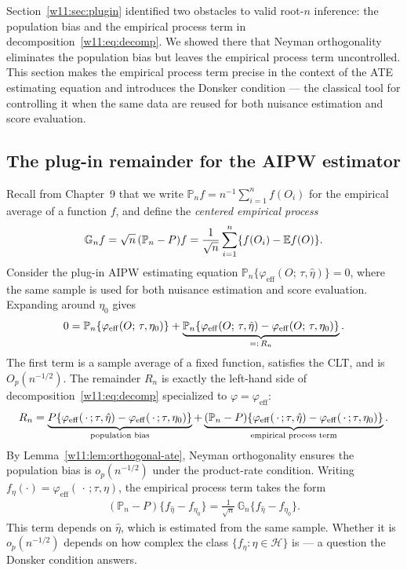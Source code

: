 \documentclass[master.tex]{subfiles}
\begin{document}
Section~\ref{w11:sec:plugin} identified two obstacles to valid
root-$n$ inference: the population bias and the empirical process
term in decomposition~\eqref{w11:eq:decomp}.  We showed there that
Neyman orthogonality eliminates the population bias but leaves the
empirical process term uncontrolled.  This section makes the
empirical process term precise in the context of the ATE estimating
equation and introduces the Donsker condition — the classical tool
for controlling it when the same data are reused for both nuisance
estimation and score evaluation.

\subsection{The plug-in remainder for the AIPW estimator}
\label{w11:subsec:ep-remainder}

Recall from Chapter~9 that we write $\mathbb{P}_n f =
n^{-1}\sum_{i=1}^n f(O_i)$ for the empirical average of a function
$f$, and define the \emph{centered empirical process}
\[
  \mathbb{G}_n f
  = \sqrt{n}\,(\mathbb{P}_n - P) f
  = \frac{1}{\sqrt{n}}\sum_{i=1}^n \{f(O_i) - \mathbb{E} f(O)\}.
\]
Consider the plug-in AIPW estimating equation
$\mathbb{P}_n\{\varphi_{\mathrm{eff}}(O;\,\tau,\hat\eta)\} = 0$,
where the same sample is used for both nuisance estimation and
score evaluation.  Expanding around $\eta_0$ gives
\begin{align}
  0
  = \mathbb{P}_n\{\varphi_{\mathrm{eff}}(O;\,\tau,\eta_0)\}
    + \underbrace{%
        \mathbb{P}_n\{
          \varphi_{\mathrm{eff}}(O;\,\tau,\hat\eta)
          -
          \varphi_{\mathrm{eff}}(O;\,\tau,\eta_0)
        \}
      }_{=:\,R_n}.
  \label{w11:eq:plugin-expand}
\end{align}
The first term is a sample average of a fixed function, satisfies
the CLT, and is $O_p(n^{-1/2})$.  The remainder $R_n$ is exactly
the left-hand side of decomposition~\eqref{w11:eq:decomp}
specialized to $\varphi = \varphi_{\mathrm{eff}}$:
\begin{align}
  R_n
  = \underbrace{%
      P\{
        \varphi_{\mathrm{eff}}(\,\cdot\,;\tau,\hat\eta)
        - \varphi_{\mathrm{eff}}(\,\cdot\,;\tau,\eta_0)
      \}
    }_{\text{population bias}}
    +
    \underbrace{%
      (\mathbb{P}_n - P)\{
        \varphi_{\mathrm{eff}}(\,\cdot\,;\tau,\hat\eta)
        - \varphi_{\mathrm{eff}}(\,\cdot\,;\tau,\eta_0)
      \}
    }_{\text{empirical process term}}.
  \label{w11:eq:Rn-decomp}
\end{align}
By Lemma~\ref{w11:lem:orthogonal-ate}, Neyman orthogonality ensures
the population bias is $o_p(n^{-1/2})$ under the product-rate
condition.  Writing $f_\eta(\cdot) =
\varphi_{\mathrm{eff}}(\,\cdot\,;\tau,\eta)$, the empirical process
term takes the form
\begin{align}
  (\mathbb{P}_n - P)\{f_{\hat\eta} - f_{\eta_0}\}
  =
  \frac{1}{\sqrt{n}}\,\mathbb{G}_n\{f_{\hat\eta} - f_{\eta_0}\}.
  \label{w11:eq:ep-term}
\end{align}
This term depends on $\hat\eta$, which is estimated from the same
sample.  Whether it is $o_p(n^{-1/2})$ depends on how complex the
class $\{f_\eta : \eta \in \mathcal{H}\}$ is — a question the
Donsker condition answers.
\end{document}
